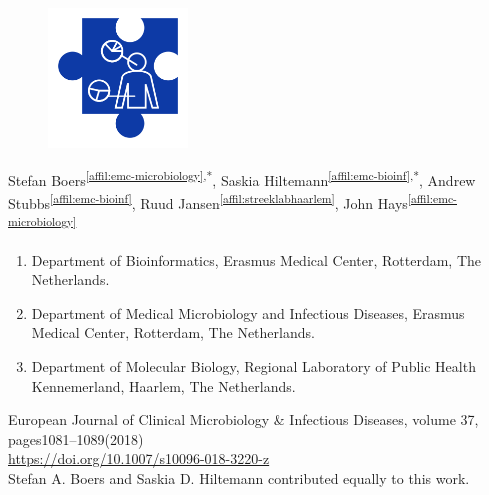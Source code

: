 \cleartorightpage
\setcounter{NAT@ctr}{-1}

\chapter*{}\label{chapter:mycrobiota}

\begin{figure}[t!]
\centering
\includegraphics[height=10em]{frontmatter/images/chapter-header-microbiota.png}
\end{figure}
\vspace{-4cm}

Stefan Boers\textsuperscript{\ref{affil:emc-microbiology},*},
Saskia Hiltemann\textsuperscript{\ref{affil:emc-bioinf},*},
Andrew Stubbs\textsuperscript{\ref{affil:emc-bioinf}},
Ruud Jansen\textsuperscript{\ref{affil:streeklabhaarlem}},
John Hays\textsuperscript{\ref{affil:emc-microbiology}}

\small
\begin{enumerate}
\itemsep-0.5em
\item Department of Bioinformatics, Erasmus Medical Center, Rotterdam, The Netherlands.\label{affil:emc-bioinf}
\item Department of Medical Microbiology and Infectious Diseases, Erasmus Medical Center, Rotterdam, The Netherlands.\label{affil:emc-microbiology}
\item Department of Molecular Biology, Regional Laboratory of Public Health Kennemerland, Haarlem, The Netherlands.\label{affil:streeklabhaarlem}
\end{enumerate}

{\color{chaptergrey}{Published in:}} European Journal of Clinical Microbiology \& Infectious Diseases, volume 37, pages1081–1089(2018) \\
{\color{chaptergrey}{DOI:}} \url{https://doi.org/10.1007/s10096-018-3220-z} \\
{\color{chaptergrey}{*:}} Stefan A. Boers and Saskia D. Hiltemann contributed equally to this work.

